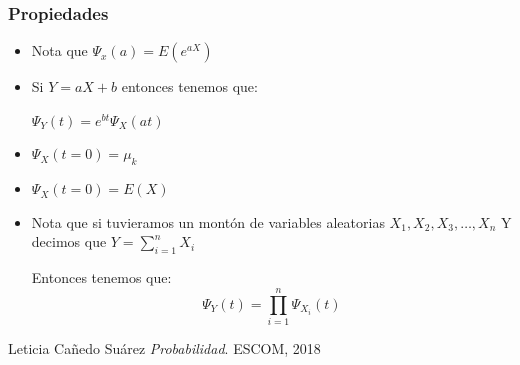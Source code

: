 \documentclass[12pt, fleqn]{report}                             %
\theoremstyle{break}                                            %
\begin{document}
                \subsubsection{Propiedades}

                    \begin{itemize}

                        \item
                            Nota que $\Psi_x(a) = E(e^{aX})$

                        \item
                            Si $Y = aX + b$ entonces tenemos que:

                            $\Psi_Y(t) = e^{bt} \Psi_X(at)$


                        \item
                            $\Psi_X (t = 0) = \mu_k$

                        \item
                            $\Psi_X (t = 0) = E(X)$

                        \item
                            Nota que si tuvieramos un montón de variables aleatorias
                            $X_1, X_2, X_3, \dots, X_n$
                            Y decimos que $\displaystyle Y = \sum_{i = 1}^n X_i$

                            Entonces tenemos que:
                            \begin{equation*}
                                \Psi_Y(t) = \prod_{i = 1}^n \Psi_{X_i}(t)
                            \end{equation*}



                    \end{itemize}






\begin{thebibliography}{10}

        Leticia Cañedo Suárez
        \textit{Probabilidad}. 
        ESCOM, 2018

\end{thebibliography}
\end{document}
